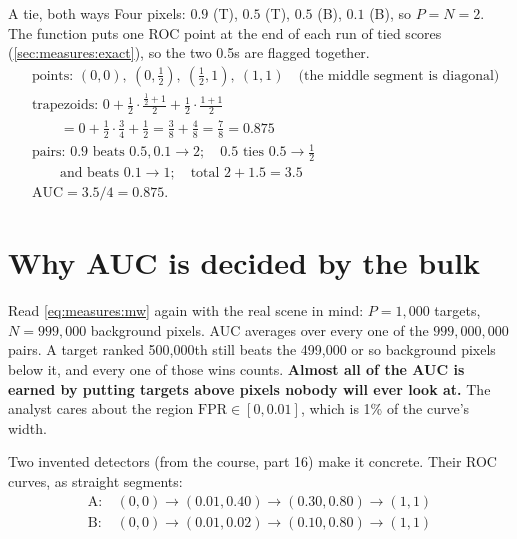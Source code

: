 \begin{worked}[label={we:measures:tie}]{A tie, both ways}
Four pixels: $0.9$ (T), $0.5$ (T), $0.5$ (B), $0.1$ (B), so $P = N = 2$. The function  puts one ROC
point at the end of each run of tied scores (\cref{sec:measures:exact}), so the two 0.5s are flagged together.
\begin{align*}
&\text{points: } (0,0),\ (0, \tfrac12),\ (\tfrac12, 1),\ (1, 1) \quad \text{(the middle segment is diagonal)}\\
&\text{trapezoids: } 0 + \tfrac12 \cdot \tfrac{\frac12 + 1}{2} + \tfrac12 \cdot \tfrac{1 + 1}{2}\\
&\qquad = 0 + \tfrac12 \cdot \tfrac34 + \tfrac12 = \tfrac38 + \tfrac48 = \tfrac78 = 0.875\\
&\text{pairs: } 0.9 \text{ beats } 0.5, 0.1 \to 2; \quad 0.5 \text{ ties } 0.5 \to \tfrac12\\
&\qquad \text{and beats } 0.1 \to 1; \quad \text{total } 2 + 1.5 = 3.5\\
&\text{AUC} = 3.5 / 4 = 0.875.
\end{align*}
\end{worked}

\section{Why AUC is decided by the bulk}\label{sec:measures:bulk}

Read \cref{eq:measures:mw} again with the real scene in mind: $P = 1{,}000$ targets, $N = 999{,}000$ background
pixels\tagA{}. AUC averages over every one of the $999{,}000{,}000$ pairs. A target ranked 500,000th still beats
the 499,000 or so background pixels below it, and every one of those wins counts. \textbf{Almost all of the AUC is
earned by putting targets above pixels nobody will ever look at.} The analyst cares about the region
$\mathrm{FPR} \in [0, 0.01]$, which is 1\% of the curve's width.

Two invented detectors (from the course, part 16) make it concrete. Their ROC curves, as straight segments:
\begin{align*}
\text{A}: &\ (0,0) \to (0.01, 0.40) \to (0.30, 0.80) \to (1,1)\\
\text{B}: &\ (0,0) \to (0.01, 0.02) \to (0.10, 0.80) \to (1,1)
\end{align*}

